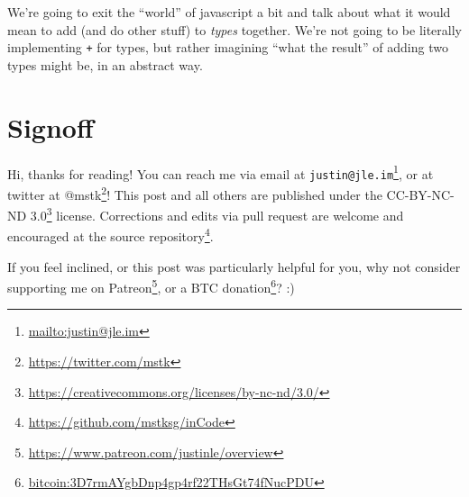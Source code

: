 \documentclass[]{article}
\renewcommand{\href}[2]{#2\footnote{\url{#1}}}
\begin{document}
We're going to exit the ``world'' of javascript a bit and talk about what it
would mean to add (and do other stuff) to \emph{types} together. We're not going
to be literally implementing \texttt{+} for types, but rather imagining ``what
the result'' of adding two types might be, in an abstract way.

\section{Signoff}\label{signoff}

Hi, thanks for reading! You can reach me via email at
\href{mailto:justin@jle.im}{\nolinkurl{justin@jle.im}}, or at twitter at
\href{https://twitter.com/mstk}{@mstk}! This post and all others are published
under the \href{https://creativecommons.org/licenses/by-nc-nd/3.0/}{CC-BY-NC-ND
3.0} license. Corrections and edits via pull request are welcome and encouraged
at \href{https://github.com/mstksg/inCode}{the source repository}.

If you feel inclined, or this post was particularly helpful for you, why not
consider \href{https://www.patreon.com/justinle/overview}{supporting me on
Patreon}, or a \href{bitcoin:3D7rmAYgbDnp4gp4rf22THsGt74fNucPDU}{BTC donation}?
:)
\end{document}
